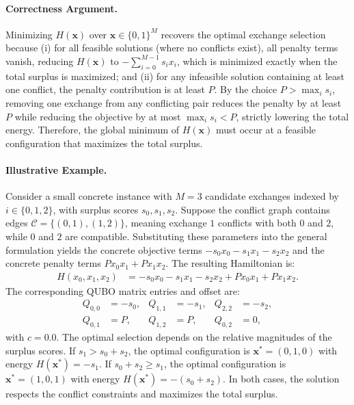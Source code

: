 \documentclass[12pt]{article}
\begin{document}
\paragraph{Correctness Argument.}
Minimizing $H(\mathbf{x})$ over $\mathbf{x} \in \{0,1\}^M$ recovers the optimal exchange selection because (i) for all feasible solutions (where no conflicts exist), all penalty terms vanish, reducing $H(\mathbf{x})$ to $-\sum_{i=0}^{M-1} s_i x_i$, which is minimized exactly when the total surplus is maximized; and (ii) for any infeasible solution containing at least one conflict, the penalty contribution is at least $P$. By the choice $P > \max_i s_i$, removing one exchange from any conflicting pair reduces the penalty by at least $P$ while reducing the objective by at most $\max_i s_i < P$, strictly lowering the total energy. Therefore, the global minimum of $H(\mathbf{x})$ must occur at a feasible configuration that maximizes the total surplus.

\paragraph{Illustrative Example.}
Consider a small concrete instance with $M=3$ candidate exchanges indexed by $i \in \{0, 1, 2\}$, with surplus scores $s_0, s_1, s_2$. Suppose the conflict graph contains edges $\mathcal{C} = \{(0,1), (1,2)\}$, meaning exchange $1$ conflicts with both $0$ and $2$, while $0$ and $2$ are compatible. Substituting these parameters into the general formulation yields the concrete objective terms $-s_0 x_0 - s_1 x_1 - s_2 x_2$ and the concrete penalty terms $P x_0 x_1 + P x_1 x_2$. The resulting Hamiltonian is:
\begin{align}
H(x_0, x_1, x_2) &= -s_0 x_0 - s_1 x_1 - s_2 x_2 + P x_0 x_1 + P x_1 x_2.
\end{align}
The corresponding QUBO matrix entries and offset are:
\begin{align}
Q_{0,0} &= -s_0, & Q_{1,1} &= -s_1, & Q_{2,2} &= -s_2, \\
Q_{0,1} &= P, & Q_{1,2} &= P, & Q_{0,2} &= 0,
\end{align}
with $c = 0.0$. The optimal selection depends on the relative magnitudes of the surplus scores. If $s_1 > s_0 + s_2$, the optimal configuration is $\mathbf{x}^* = (0, 1, 0)$ with energy $H(\mathbf{x}^*) = -s_1$. If $s_0 + s_2 \ge s_1$, the optimal configuration is $\mathbf{x}^* = (1, 0, 1)$ with energy $H(\mathbf{x}^*) = -(s_0 + s_2)$. In both cases, the solution respects the conflict constraints and maximizes the total surplus.
\end{document}
